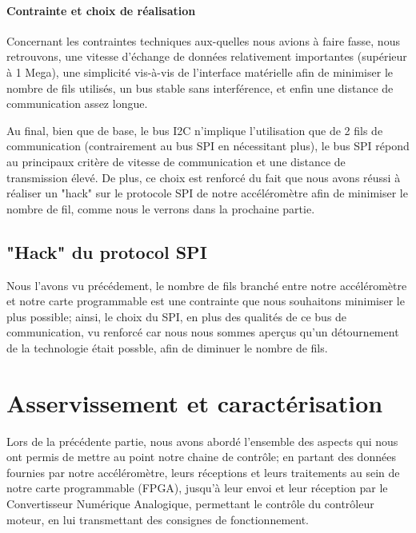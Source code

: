 \documentclass[french,a4paper,12pt]{report}
\begin{document}
 \subsection{Contrainte et choix de réalisation}
Concernant les contraintes techniques aux-quelles nous avions à faire fasse, nous retrouvons, une vitesse d'échange de données relativement importantes (supérieur à 1 Mega), une simplicité vis-à-vis de l'interface matérielle afin de minimiser le nombre de fils utilisés, un bus stable sans interférence, et enfin une distance de communication assez longue.

Au final, bien que de base, le bus I2C n'implique l'utilisation que de 2 fils de communication (contrairement au bus SPI en nécessitant plus), le bus SPI répond au principaux critère de vitesse de communication et une distance de transmission élevé. De plus, ce choix est renforcé du fait que nous avons réussi à réaliser un "hack" sur le protocole SPI de notre accéléromètre afin de minimiser le nombre de fil, comme nous le verrons dans la prochaine partie.


\chapter{"Hack" du protocol SPI} %
	Nous l'avons vu précédement, le nombre de fils branché entre notre accéléromètre et notre carte programmable est une contrainte que nous souhaitons minimiser le plus possible; ainsi, le choix du SPI, en plus des qualités de ce bus de communication, vu renforcé car nous nous sommes aperçus qu'un détournement de la technologie était possble, afin de diminuer le nombre de fils.
		
			

%
%
	\part{Asservissement et caractérisation}
	
	Lors de la précédente partie, nous avons abordé l'ensemble des aspects qui nous ont permis de mettre au point notre chaine de contrôle; en partant des données fournies par notre accéléromètre, leurs réceptions et leurs traitements au sein de notre carte programmable (FPGA), jusqu'à leur envoi et leur réception par le Convertisseur Numérique Analogique, permettant le contrôle du contrôleur moteur, en lui transmettant des consignes de fonctionnement.
	
\end{document}
